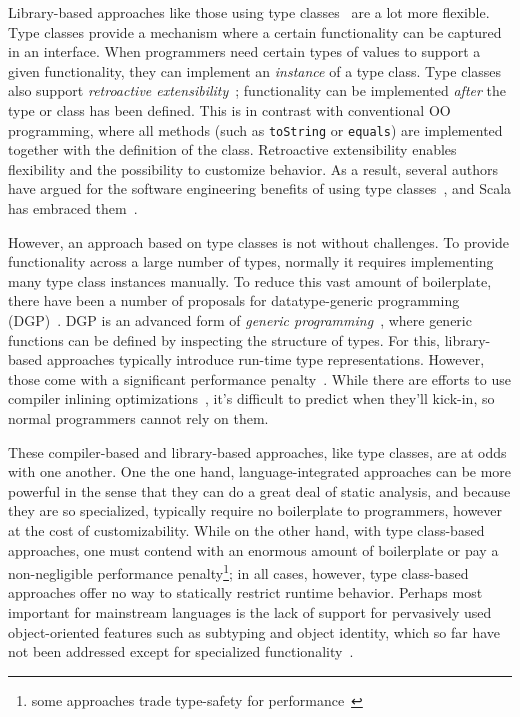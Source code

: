 \documentclass[preprint,nocopyrightspace]{sigplanconf}
\begin{document}
Library-based approaches like those using type
classes~\cite{WadlerTypeClasses} are a lot more flexible. Type classes provide
a mechanism where a certain functionality can be captured in an interface.
When programmers need certain types of values to support a given
functionality, they can implement an \emph{instance} of a type class. Type
classes also support \emph{retroactive
extensibility}~\cite{RetroactiveExtensibility}; functionality can be
implemented \emph{after} the type or class has been defined. This is in
contrast with conventional OO programming, where all methods (such as
\lstinline{toString} or \lstinline{equals}) are implemented together with the
definition of the class. Retroactive extensibility enables flexibility and the
possibility to customize behavior. As a result, several authors have argued
for the software engineering benefits of using type
classes~\cite{RetroactiveExtensibility,Oliveira2010}, and Scala has embraced
them~\cite{Oliveira2010,ScalaCollections,Pickling}.

However, an approach based on type classes is not without challenges. To
provide functionality across a large number of types, normally it requires
implementing many type class instances manually. To reduce this vast amount of
boilerplate, there have been a number of proposals for datatype-generic
programming (DGP)~\cite{ComparingGPHaskellRodriquez, ComparingGPHaskellHinze}.
DGP is an advanced form of \emph{generic programming}~\cite{GP}, where generic
functions can be defined by inspecting the structure of types. For this,
library-based approaches typically introduce run-time type representations.
However, those come with a significant performance
penalty~\cite{TemplateYourBoilerplate}. While there are efforts to use
compiler inlining optimizations~\cite{OptimizingDGP}, it's difficult to
predict when they'll kick-in, so normal programmers cannot rely on them.

These compiler-based and library-based approaches, like type classes, are at
odds with one another. One the one hand, language-integrated approaches can be
more powerful in the sense that they can do a great deal of static analysis,
and because they are so specialized, typically require no boilerplate to
programmers, however at the cost of customizability. While on the other hand,
with type class-based approaches, one must contend with an enormous amount of
boilerplate or pay a non-negligible performance penalty\footnote{some
approaches trade type-safety for performance~\cite{TemplateYourBoilerplate}};
in all cases, however, type class-based approaches offer no way to statically
restrict runtime behavior. Perhaps most important for mainstream languages is
the lack of support for pervasively used object-oriented features such as
subtyping and object identity, which so far have not been addressed except for
specialized functionality~\cite{Pickling}.
\end{document}
